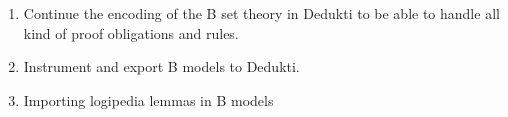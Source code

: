 \begin{enumerate}

  \item Continue the encoding of the B set theory in Dedukti to be
  able to handle all kind of proof obligations and rules.

\item Instrument and export B models to Dedukti.

  \item Importing logipedia lemmas in B models

\end{enumerate}
